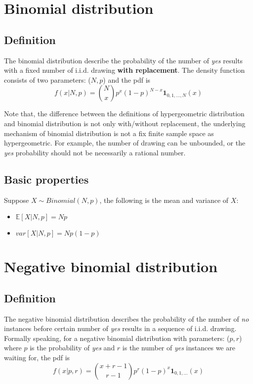 \documentclass[../Distributions.tex]{subfiles}
\begin{document}
\section{Binomial distribution}
\subsection{Definition}
The binomial distribution describe the probability of the number of {\it yes} results with a fixed number of i.i.d. drawing {\bf with replacement}. The density function consists of two parameters: ($N,p$) and the pdf is
$$f(x|N,p) = {N\choose x}p^x(1-p)^{N-x}\mathbf{1}_{0,1,...,N}(x)$$

Note that, the difference between the definitions of hypergeometric distribution and binomial distribution is not only with/without replacement, the underlying mechanism of binomial distribution is not a fix finite sample space as hypergeometric. For example, the number of drawing can be unbounded, or the {\it yes} probability should not be necessarily a rational number.

\subsection{Basic properties}
Suppose $X\sim\textit{Binomial}(N,p)$, the following is the mean and variance of $X$:
\begin{itemize}
	\item $\mathbb{E}[X|N,p] = Np$
	\item $var[X|N,p] = Np(1-p)$
\end{itemize}

\section{Negative binomial distribution}
\subsection{Definition}
The negative binomial distribution describes the probability of the number of {\it no} instances before certain number of {\it yes} results in a sequence of i.i.d. drawing. Formally speaking, for a negative binomial distribution with parameters: ($p,r$) where $p$ is the probability of {\it yes} and $r$ is the number of {\it yes} instances we are waiting for, the pdf is
$$f(x|p,r) = {x+r-1\choose r-1}p^r(1-p)^x\mathbf{1}_{0,1,...}(x)$$
\end{document}
